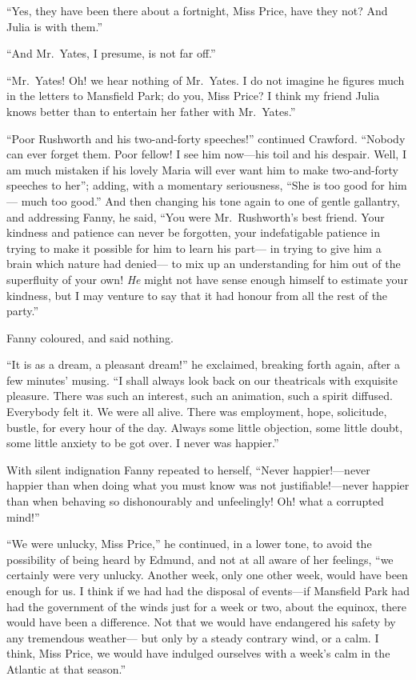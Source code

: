 ``Yes, they have been there about a fortnight, Miss Price,
have they not?  And Julia is with them.''

``And Mr.\ Yates, I presume, is not far off.''

``Mr.\ Yates!  Oh! we hear nothing of Mr.\ Yates.  I do not
imagine he figures much in the letters to Mansfield Park;
do you, Miss Price?  I think my friend Julia knows better
than to entertain her father with Mr.\ Yates.''

``Poor Rushworth and his two-and-forty speeches!''
continued Crawford.  ``Nobody can ever forget them.
Poor fellow!  I see him now---his toil and his despair.
Well, I am much mistaken if his lovely Maria will ever
want him to make two-and-forty speeches to her''; adding,
with a momentary seriousness, ``She is too good for him---%
much too good.''  And then changing his tone again to one
of gentle gallantry, and addressing Fanny, he said,
``You were Mr.\ Rushworth's best friend.  Your kindness and
patience can never be forgotten, your indefatigable patience
in trying to make it possible for him to learn his part---%
in trying to give him a brain which nature had denied---%
to mix up an understanding for him out of the superfluity
of your own!  \emph{He} might not have sense enough himself
to estimate your kindness, but I may venture to say that it
had honour from all the rest of the party.''

Fanny coloured, and said nothing.

``It is as a dream, a pleasant dream!'' he exclaimed,
breaking forth again, after a few minutes' musing.  ``I shall
always look back on our theatricals with exquisite pleasure.
There was such an interest, such an animation, such a
spirit diffused.  Everybody felt it.  We were all alive.
There was employment, hope, solicitude, bustle, for every
hour of the day.  Always some little objection,
some little doubt, some little anxiety to be got over.
I never was happier.''

With silent indignation Fanny repeated to herself,
``Never happier!---never happier than when doing what
you must know was not justifiable!---never happier
than when behaving so dishonourably and unfeelingly!
Oh! what a corrupted mind!''

``We were unlucky, Miss Price,'' he continued, in a lower tone,
to avoid the possibility of being heard by Edmund,
and not at all aware of her feelings, ``we certainly
were very unlucky.  Another week, only one other week,
would have been enough for us.  I think if we had had the
disposal of events---if Mansfield Park had had the government
of the winds just for a week or two, about the equinox,
there would have been a difference.  Not that we would
have endangered his safety by any tremendous weather---%
but only by a steady contrary wind, or a calm.  I think,
Miss Price, we would have indulged ourselves with a week's
calm in the Atlantic at that season.''

